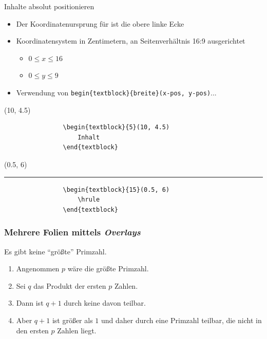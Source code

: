 \documentclass[
	aspectratio=169,	%
	onlytextwidth,		%
	t,					%
	]{beamer}
\begin{document}
	

	\begin{frame}[fragile]{Inhalte absolut positionieren}
		\begin{itemize}
			\item Der Koordinatenursprung für ist die obere linke Ecke
			\item Koordinatensystem in Zentimetern, an Seitenverhältnis 16:9 ausgerichtet
			\begin{itemize}
				\item $ 0 \le x \le 16 $
				\item $ 0 \le y \le 9 $
			\end{itemize}

			\item Verwendung von \verb!begin{textblock}{breite}(x-pos, y-pos)!...
		\end{itemize}

		\begin{textblock}{5}(10, 4.5)
			\scriptsize
			\begin{verbatim}
				\begin{textblock}{5}(10, 4.5)
					Inhalt
				\end{textblock}
			\end{verbatim}
		\end{textblock}

		\begin{textblock}{15}(0.5, 6)
			\hrule
			\scriptsize
			\begin{verbatim}
				\begin{textblock}{15}(0.5, 6)
					\hrule
				\end{textblock}
			\end{verbatim}
		\end{textblock}
	\end{frame}

	\begin{frame} 
		\frametitle{Mehrere Folien mittels \textit{Overlays}} 
		\begin{theorem}
			Es gibt keine \enquote{größte} Primzahl.
		\end{theorem} 
		\begin{enumerate} 
			\item<1-| alert@1> Angenommen $p$ wäre die größte Primzahl.
			\item<2-> Sei $q$ das Produkt der ersten $p$ Zahlen. 
			\item<3-> Dann ist $q+1$ durch keine davon teilbar.
			\item<4-> Aber $q + 1$ ist größer als $1$ und daher durch eine Primzahl teilbar, die nicht in den ersten $p$ Zahlen liegt.
		\end{enumerate}


		\vfill
		\vfill
	\end{frame}

	
	\appendix
	\makebibliography
	\makethankyou
\end{document}
